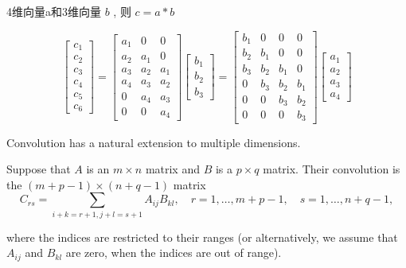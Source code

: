 \begin{example}
    4维向量a和3维向量 $ b $ ,  则 $ c=a * b $

\begin{equation}
\left[\begin{array}{l}
c_{1} \\
c_{2} \\
c_{3} \\
c_{4} \\
c_{5} \\
c_{6}
\end{array}\right]=\left[\begin{array}{lll}
a_{1} & 0 & 0 \\
a_{2} & a_{1} & 0 \\
a_{3} & a_{2} & a_{1} \\
a_{4} & a_{3} & a_{2} \\
0 & a_{4} & a_{3} \\
0 & 0 & a_{4}
\end{array}\right]\left[\begin{array}{l}
b_{1} \\
b_{2} \\
b_{3}
\end{array}\right]=\left[\begin{array}{cccc}
b_{1} & 0 & 0 & 0 \\
b_{2} & b_{1} & 0 & 0 \\
b_{3} & b_{2} & b_{1} & 0 \\
0 & b_{3} & b_{2} & b_{1} \\
0 & 0 & b_{3} & b_{2} \\
0 & 0 & 0 & b_{3}
\end{array}\right]\left[\begin{array}{l}
a_{1} \\
a_{2} \\
a_{3} \\
a_{4}
\end{array}\right]
\end{equation}
\end{example}

Convolution has a natural extension to multiple dimensions.

\begin{definition}[2-D convolution]
     Suppose that $ A $ is an $ m \times n $ matrix and $ B $ is a $ p \times q $ matrix. Their convolution is the $ (m+p-1) \times(n+q-1) $ matrix
\begin{equation}
C_{r s}=\sum_{i+k=r+1, j+l=s+1} A_{i j} B_{k l}, \quad r=1, \ldots, m+p-1, \quad s=1, \ldots, n+q-1,
\end{equation}

where the indices are restricted to their ranges (or alternatively, we assume that $ A_{i j} $ and $ B_{k l} $ are zero, when the indices are out of range). 
\end{definition}


